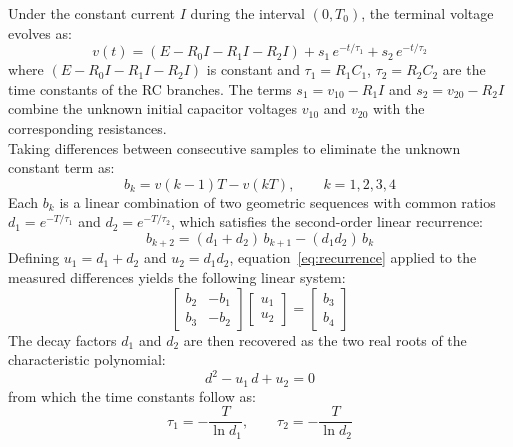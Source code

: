 Under the constant current $I$ during the interval $(0, T_0)$, the terminal voltage evolves as:
\begin{equation}
    v(t) = (E - R_0 I - R_1 I - R_2 I) + s_1\, e^{-t/\tau_1} + s_2\, e^{-t/\tau_2}
    \label{eq:v_phase1}
\end{equation}
where $(E - R_0 I - R_1 I - R_2 I)$ is constant and $\tau_1 = R_1 C_1$, $\tau_2 = R_2 C_2$ are the time 
constants of the RC branches. The terms $s_1 = v_{10} - R_1 I$ and $s_2 = v_{20} - R_2 I$ combine the unknown initial 
capacitor voltages $v_{10}$ and $v_{20}$ with the corresponding resistances.
\\
Taking differences between consecutive samples to eliminate the unknown constant term as:
\begin{equation}
    b_k = v(k-1)T - v(kT), \qquad k = 1,2,3,4
    \label{eq:bk}
\end{equation}
Each $b_k$ is a linear combination of two geometric sequences with common ratios 
$d_1 = e^{-T/\tau_1}$ and $d_2 = e^{-T/\tau_2}$, which satisfies the second-order linear recurrence:
\begin{equation}
    b_{k+2} = (d_1 + d_2)\,b_{k+1} - (d_1 d_2)\,b_k
    \label{eq:recurrence}
\end{equation}
Defining $u_1 = d_1 + d_2$ and $u_2 = d_1 d_2$, equation~\eqref{eq:recurrence} applied 
to the measured differences yields the following linear system:
\begin{equation}
    \begin{bmatrix} 
        b_2 & -b_1 \\ 
        b_3 & -b_2 
    \end{bmatrix}
    \begin{bmatrix} 
        u_1 \\ 
        u_2 
    \end{bmatrix}
    =
    \begin{bmatrix} 
        b_3 \\ 
        b_4 
    \end{bmatrix}
    \label{eq:u_system}
\end{equation}
The decay factors $d_1$ and $d_2$ are then recovered as the two real roots of the characteristic polynomial:
\begin{equation}
    d^2 - u_1\, d + u_2 = 0
    \label{eq:quadratic}
\end{equation}
from which the time constants follow as:
\begin{equation}
    \tau_1 = -\frac{T}{\ln d_1}, \qquad \tau_2 = -\frac{T}{\ln d_2}
    \label{eq:taus}
\end{equation}
